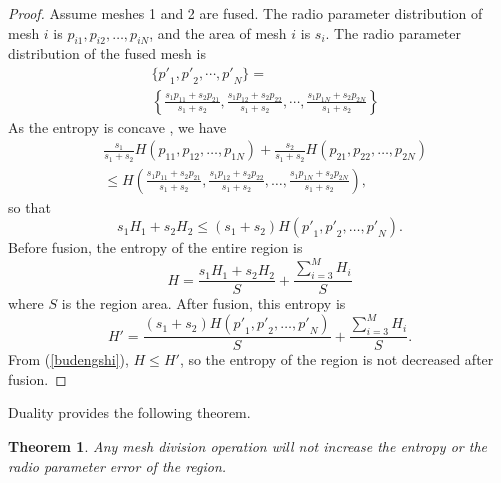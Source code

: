 \documentclass[conference]{IEEEtran}
\newtheorem{Theo}{Theorem}
\begin{document}
\begin{proof}
Assume meshes 1 and 2 are fused.
The radio parameter distribution of mesh $i$ is ${p_{i1}},{p_{i2}}, \ldots ,{p_{iN}}$, and the area of mesh $i$ is $s_i$.
The radio parameter distribution of the fused mesh is
\begin{equation}
\begin{aligned}
& \{ {{p'}_1},{{p'}_2}, \cdots ,{{p'}_N}\}  =  \\
& \left\{ \frac{{{s_1}{p_{11}} + {s_2}{p_{21}}}}{{{s_1} + {s_2}}},\frac{{{s_1}{p_{12}} +
{s_2}{p_{22}}}}{{{s_1} + {s_2}}}, \cdots ,\frac{{{s_1}{p_{1N}} + {s_2}{p_{2N}}}}{{{s_1} +
{s_2}}}\right\}
\end{aligned}
\end{equation}
As the entropy is concave \cite{Cover}, we have
\begin{equation}
\begin{aligned}
& \frac{{{s_1}}}{{{s_1} + {s_2}}}H({p_{11}},{p_{12}}, \ldots ,{p_{1N}}) + \frac{{{s_2}}}{{{s_1} + {s_2}}}H({p_{21}},{p_{22}}, \ldots ,{p_{2N}}) \\
&  \le H\left(\frac{{{s_1}{p_{11}} + {s_2}{p_{21}}}}{{{s_1} + {s_2}}},\frac{{{s_1}{p_{12}} +
{s_2}{p_{22}}}}{{{s_1} + {s_2}}}, \ldots ,\frac{{{s_1}{p_{1N}} + {s_2}{p_{2N}}}}{{{s_1} + {s_2}}}\right),
\end{aligned}
\end{equation}
so that
\begin{equation}\label{budengshi}
{s_1}{H_1} + {s_2}{H_2} \le ({s_1} + {s_2})H({{p'}_1},{{p'}_2}, \ldots, {{p'}_N}).
\end{equation}
Before fusion, the entropy of the entire region is
\begin{equation}
H = \frac{{{s_1}{H_1} + {s_2}{H_2}}}{S} + \frac{{\sum\limits_{i = 3}^M {{H_i}} }}{S}
\end{equation}
where $S$ is the region area.
After fusion, this entropy is
\begin{equation}
H' = \frac{{({s_1} + {s_2})H({{p'}_1},{{p'}_2}, \ldots, {{p'}_N})}}{S} +
\frac{{\sum\limits_{i = 3}^M {{H_i}} }}{S}.
\end{equation}
From (\ref{budengshi}), $H \le H'$, so the entropy of the region is not decreased after fusion.
\end{proof}

Duality provides the following theorem.
\begin{Theo}\label{th_mesh_division_reduce_entropy}
Any mesh division operation will not increase the entropy or the radio parameter error of the region.
\end{Theo}
\end{document}
